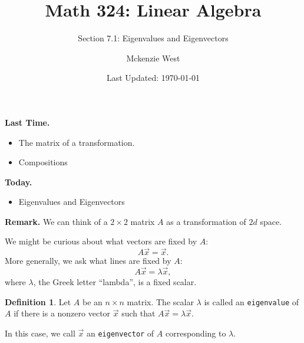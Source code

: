 \documentclass{beamer}
\newcommand{\fn}{\insertframenumber}
\theoremstyle{definition}
\newtheorem*{defn}{Definition}
\renewcommand{\emph}[1]{{\color{blue}\texttt{#1}}}
\begin{document}
	\title{Math 324: Linear Algebra}
	\subtitle{Section 7.1: Eigenvalues and Eigenvectors}
	\author{Mckenzie West}
	\date{Last Updated: \today}
\begin{frame}[fragile]
\maketitle	
\end{frame}

\begin{frame}{\insertframenumber}
	\begin{block}{\textbf{Last Time.}}
	\begin{itemize}[label=--]
		\item The matrix of a transformation.
		\item Compositions
	\end{itemize}
	\end{block}
	\begin{block}{\textbf{Today.}}
		\begin{itemize}[label=--]
			\item Eigenvalues and Eigenvectors
		\end{itemize}
	\end{block}
\end{frame}
\begin{frame}{\fn}
	\begin{block}{\textbf{Remark.}}
		We can think of a $2\times 2$ matrix $A$ as a transformation of $2d$ space.
		
		We might be curious about what vectors are fixed by $A$:
			\[A\vec x=\vec x.\]
		More generally, we ask what lines are fixed by $A$:
			\[A\vec x=\lambda\vec x,\]
		where $\lambda$, the Greek letter ``lambda'', is a fixed scalar.
	\end{block}
	\begin{defn}
		Let $A$ be an $n\times n$ matrix.  The scalar $\lambda$ is called an \emph{eigenvalue} of $A$ if there is a nonzero vector $\vec x$ such that $A\vec x=\lambda \vec x$.  
		
		In this case, we call $\vec x$ an \emph{eigenvector} of $A$ corresponding to $\lambda$.
	\end{defn}
\end{frame}
\end{document}

